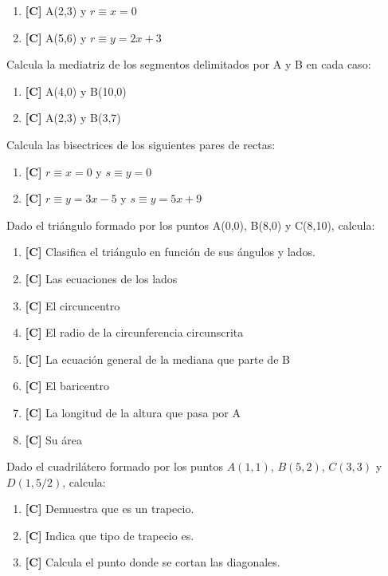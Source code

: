 \begin{enumerate}[topsep=0pt]
\item \textbf{[C]} A(2,3) y $ r \equiv x = 0 $
	\item \textbf{[C]} A(5,6) y $ r \equiv y = 2x + 3 $
\end{enumerate}


\Exercicio Calcula la mediatriz de los segmentos delimitados por A y B en cada caso:

\begin{enumerate}[topsep=0pt]
\item \textbf{[C]} A(4,0) y B(10,0)
	\item \textbf{[C]} A(2,3) y B(3,7)
\end{enumerate}


\Exercicio Calcula las bisectrices de los siguientes pares de rectas:

\begin{enumerate}[topsep=0pt]
\item \textbf{[C]} $ r \equiv x=0 $ y $ s \equiv y = 0 $
	\item \textbf{[C]} $ r \equiv y = 3x - 5 $ y $ s \equiv y = 5x + 9 $
\end{enumerate}


\Exercicio Dado el triángulo formado por los puntos A(0,0), B(8,0) y C(8,10), calcula:

\begin{enumerate}[topsep=0pt]
\item \textbf{[C]} Clasifica el triángulo en función de sus ángulos y lados.
	\item \textbf{[C]} Las ecuaciones de los lados
	\item \textbf{[C]} El circuncentro
	\item \textbf{[C]} El radio de la circunferencia circunscrita
	\item \textbf{[C]} La ecuación general de la mediana que parte de B
	\item \textbf{[C]} El baricentro
	\item \textbf{[C]} La longitud de la altura que pasa por A
	\item \textbf{[C]} Su área
\end{enumerate}


\Exercicio Dado el cuadrilátero formado por los puntos $A(1,1)$, $B(5,2)$, $C(3,3)$ y $D(1, 5/2)$, calcula:

\begin{enumerate}[topsep=0pt]
\item \textbf{[C]} Demuestra que es un trapecio.
	\item \textbf{[C]} Indica que tipo de trapecio es.
	\item \textbf{[C]} Calcula el punto donde se cortan las diagonales.
\end{enumerate}


